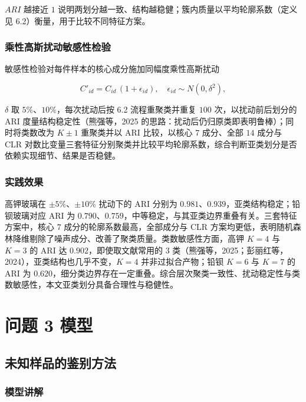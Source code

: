 \documentclass{ctexart}
\begin{document}
$ARI$ 越接近 $1$ 说明两划分越一致、结构越稳健；簇内质量以平均轮廓系数（定义见 6.2）衡量，用于比较不同特征方案。


\subsubsection{乘性高斯扰动敏感性检验}

敏感性检验对每件样本的核心成分施加同幅度乘性高斯扰动

\begin{equation*}
C'_{id}=C_{id}\,(1+\epsilon_{id}),\quad \epsilon_{id}\sim N(0,\delta^{2}),
\end{equation*}

$\delta$ 取 $5\%$、$10\%$，每次扰动后按 6.2 流程重聚类并重复 $100$ 次，以扰动前后划分的 ARI 度量结构稳定性（熊强等，2025 的思路：扰动后仍归原类即表明鲁棒）；同时将类数改为 $K\pm1$ 重聚类并以 ARI 比较，以核心 $7$ 成分、全部 $14$ 成分与 CLR 对数比变量三套特征分别聚类并比较平均轮廓系数，综合判断亚类划分是否依赖实现细节、结果是否稳健。


\subsubsection{实践效果}

高钾玻璃在 $\pm5\%$、$\pm10\%$ 扰动下的 ARI 分别为 $0.981$、$0.939$，亚类结构稳定；铅钡玻璃对应 ARI 为 $0.790$、$0.759$，中等稳定，与其亚类边界重叠有关。三套特征方案中，核心 $7$ 成分的轮廓系数最高，全部成分与 CLR 方案均更低，表明随机森林降维剔除了噪声成分、改善了聚类质量。类数敏感性方面，高钾 $K=4$ 与 $K=3$ 的 ARI 达 $0.902$，即使取文献常用的 $3$ 类（熊强等，2025；彭丽红等，2024），亚类结构也几乎不变，$K=4$ 并非过拟合产物；铅钡 $K=6$ 与 $K=7$ 的 ARI 为 $0.620$，细分类边界存在一定重叠。综合层次聚类一致性、扰动稳定性与类数敏感性，本文亚类划分具备合理性与稳健性。

\section{问题 3 模型}

\subsection{未知样品的鉴别方法}

\subsubsection{模型讲解}
\end{document}
